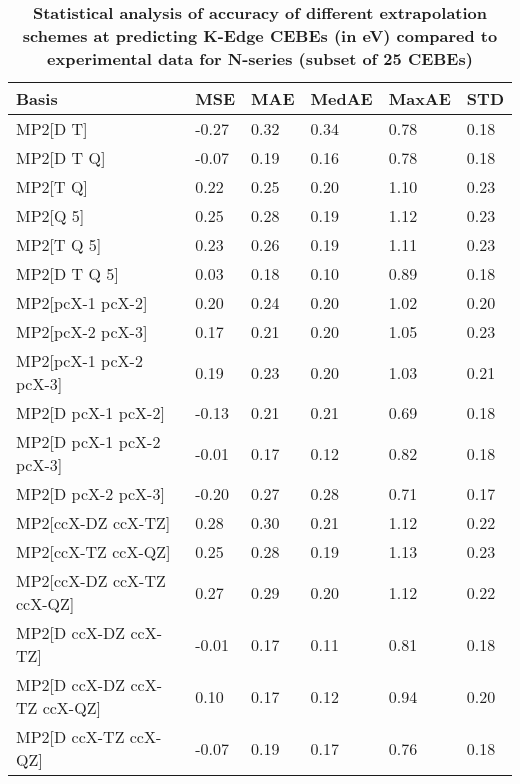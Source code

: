 \begin{table}
  \caption{\textbf{Statistical analysis of accuracy of different extrapolation schemes at predicting K-Edge CEBEs (in eV) compared to experimental data for N-series (subset of 25 CEBEs)}}
  \begin{tabular}{l l l l l l }
    \toprule
    \textbf{Basis} & \textbf{MSE} & \textbf{MAE} & \textbf{MedAE} & \textbf{MaxAE} & \textbf{STD} \\ 
    \midrule
    MP2[D T] & -0.27 & 0.32 & 0.34 & 0.78 & 0.18 \\ 
    MP2[D T Q] & -0.07 & 0.19 & 0.16 & 0.78 & 0.18 \\ 
    MP2[T Q] & 0.22 & 0.25 & 0.20 & 1.10 & 0.23 \\ 
    MP2[Q 5] & 0.25 & 0.28 & 0.19 & 1.12 & 0.23 \\ 
    MP2[T Q 5] & 0.23 & 0.26 & 0.19 & 1.11 & 0.23 \\ 
    MP2[D T Q 5] & 0.03 & 0.18 & 0.10 & 0.89 & 0.18 \\ 
    MP2[pcX-1 pcX-2] & 0.20 & 0.24 & 0.20 & 1.02 & 0.20 \\ 
    MP2[pcX-2 pcX-3] & 0.17 & 0.21 & 0.20 & 1.05 & 0.23 \\ 
    MP2[pcX-1 pcX-2 pcX-3] & 0.19 & 0.23 & 0.20 & 1.03 & 0.21 \\ 
    MP2[D pcX-1 pcX-2] & -0.13 & 0.21 & 0.21 & 0.69 & 0.18 \\ 
    MP2[D pcX-1 pcX-2 pcX-3] & -0.01 & 0.17 & 0.12 & 0.82 & 0.18 \\ 
    MP2[D pcX-2 pcX-3] & -0.20 & 0.27 & 0.28 & 0.71 & 0.17 \\ 
    MP2[ccX-DZ ccX-TZ] & 0.28 & 0.30 & 0.21 & 1.12 & 0.22 \\ 
    MP2[ccX-TZ ccX-QZ] & 0.25 & 0.28 & 0.19 & 1.13 & 0.23 \\ 
    MP2[ccX-DZ ccX-TZ ccX-QZ] & 0.27 & 0.29 & 0.20 & 1.12 & 0.22 \\ 
    MP2[D ccX-DZ ccX-TZ] & -0.01 & 0.17 & 0.11 & 0.81 & 0.18 \\ 
    MP2[D ccX-DZ ccX-TZ ccX-QZ] & 0.10 & 0.17 & 0.12 & 0.94 & 0.20 \\ 
    MP2[D ccX-TZ ccX-QZ] & -0.07 & 0.19 & 0.17 & 0.76 & 0.18 \\ 
    \bottomrule
  \end{tabular}
\end{table}
